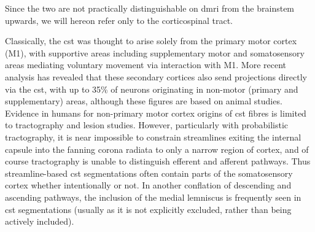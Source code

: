 Since the two are not practically distinguishable on \gls{dmri} from the brainstem upwards, we will hereon refer only to the corticospinal tract.%
%

Classically, the \gls{cst} was thought to arise solely from the primary motor cortex (M1), with supportive areas including supplementary motor and somatosensory areas mediating voluntary movement via interaction with M1.
More recent analysis has revealed that these secondary cortices also send projections directly via the \gls{cst},\autocite{Kandel2021} with up to 35\% of neurons originating in non-motor (primary and supplementary) areas, although these figures are based on animal studies.\autocite{Welniarz2017}
Evidence in humans for non-primary motor cortex origins of \gls{cst} fibres is limited to tractography and lesion studies.\autocite{Kumar2009,Jane1967}
However, particularly with probabilistic tractography, it is near impossible to constrain streamlines exiting the internal capsule into the fanning corona radiata to only a narrow region of cortex, and of course tractography is unable to distinguish efferent and afferent pathways.
Thus streamline-based \gls{cst} segmentations often contain parts of the somatosensory cortex whether intentionally or not.\autocite{Poulin2022a}
In another conflation of descending and ascending pathways, the inclusion of the medial lemniscus is frequently seen in \gls{cst} segmentations (usually as it is not explicitly excluded, rather than being actively included).\autocite{Wasserthal2018,Warrington2020,Poulin2022a}

